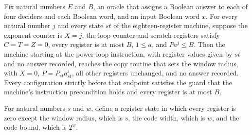 \begin{theorem}
\label{Complexity.LogProg.SavitchARM.pw_run}
\leanok
{}
Fix natural numbers $E$ and $B$, an oracle that assigns a Boolean answer to each of four
deciders and each Boolean word, and an input Boolean word $x$. For every natural number
$j$ and every state $st$ of the eighteen-register machine, suppose the exponent counter
is $X=j$, the loop counter and scratch registers satisfy $C=T=Z=0$, every register is at
most $B$, $1\le a$, and $P a^j\le B$. Then the machine starting at the power-loop
instruction, with register values given by $st$ and no answer recorded, reaches the copy
routine that sets the window radius, with $X=0$, $P=P_{st}a_{st}^j$, all other registers
unchanged, and no answer recorded. Every configuration strictly before that endpoint
satisfies the guard that the machine’s instruction precondition holds and every register
is at most $B$.
\end{theorem}

\begin{definition}
\label{Complexity.LogProg.SavitchARM.setSt}
\leanok
{}
For natural numbers $s$ and $w$, define a register state in which every register is zero
except the window radius, which is $s$, the code width, which is $w$, and the code
bound, which is $2^w$.
\end{definition}

